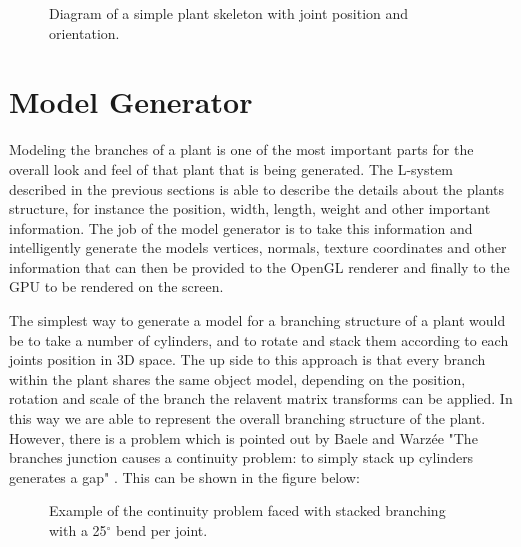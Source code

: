 \begin{figure}[htbp]
	{\centering
		\vspace{7px}
		\setlength{\fboxrule}{1pt}
		\caption{Diagram of a simple plant skeleton with joint position and orientation.}
	}
\end{figure}

\FloatBarrier


\section{Model Generator}

\begin{flushleft}

Modeling the branches of a plant is one of the most important parts for the overall look and feel of that plant that is being generated. The L-system described in the previous sections is able to describe the details about the plants structure, for instance the position, width, length, weight and other important information. The job of the model generator is to take this information and intelligently generate the models vertices, normals, texture coordinates and other information that can then be provided to the OpenGL renderer and finally to the GPU to be rendered on the screen. \\

\vspace{5mm}

The simplest way to generate a model for a branching structure of a plant would be to take a number of cylinders, and to rotate and stack them according to each joints position in 3D space. The up side to this approach is that every branch within the plant shares the same object model, depending on the position, rotation and scale of the branch the relavent matrix transforms can be applied. In this way we are able to represent the overall branching structure of the plant. However, there is a problem which is pointed out by Baele and Warz\'{e}e "The branches junction causes a continuity problem: to simply stack up cylinders generates a gap" \cite{baele2005real}. This can be shown in the figure below:

\FloatBarrier

\begin{figure}[htbp]
	{\centering
		\vspace{7px}
		\setlength{\fboxrule}{1pt}
		\caption{Example of the continuity problem faced with stacked branching with a 25$^{\circ}$ bend per joint.}
	}
\end{figure}


\end{flushleft}
